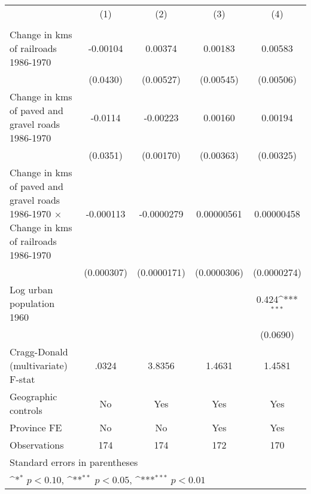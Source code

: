 {
\def\sym#1{\ifmmode^{#1}\else\(^{#1}\)\fi}
\begin{tabular}{l*{4}{c}}
\hline\hline
                &\multicolumn{1}{c}{(1)}&\multicolumn{1}{c}{(2)}&\multicolumn{1}{c}{(3)}&\multicolumn{1}{c}{(4)}\\
                &\multicolumn{1}{c}{}&\multicolumn{1}{c}{}&\multicolumn{1}{c}{}&\multicolumn{1}{c}{}\\
\hline
Change in kms of railroads 1986-1970& -0.00104         &  0.00374         &  0.00183         &  0.00583         \\
                & (0.0430)         &(0.00527)         &(0.00545)         &(0.00506)         \\
[1em]
Change in kms of paved and gravel roads 1986-1970&  -0.0114         & -0.00223         &  0.00160         &  0.00194         \\
                & (0.0351)         &(0.00170)         &(0.00363)         &(0.00325)         \\
[1em]
Change in kms of paved and gravel roads 1986-1970 $\times$ Change in kms of railroads 1986-1970&-0.000113         &-0.0000279         &0.00000561         &0.00000458         \\
                &(0.000307)         &(0.0000171)         &(0.0000306)         &(0.0000274)         \\
[1em]
Log urban population 1960&                  &                  &                  &    0.424\sym{***}\\
                &                  &                  &                  & (0.0690)         \\
\hline
Cragg-Donald (multivariate) F-stat&    .0324         &   3.8356         &   1.4631         &   1.4581         \\
Geographic controls&       No         &      Yes         &      Yes         &      Yes         \\
Province FE     &       No         &       No         &      Yes         &      Yes         \\
Observations    &      174         &      174         &      172         &      170         \\
\hline\hline
\multicolumn{5}{l}{\footnotesize Standard errors in parentheses}\\
\multicolumn{5}{l}{\footnotesize \sym{*} \(p<0.10\), \sym{**} \(p<0.05\), \sym{***} \(p<0.01\)}\\
\end{tabular}
}
